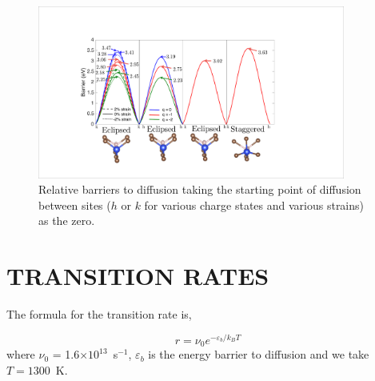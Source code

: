 \documentclass[aps,prb,preprint,superscriptaddress]{revtex4-1}
\begin{document}
\begin{figure}[ht!] 
\centering         
\includegraphics[width=0.9\textwidth]{barriers3.pdf}
\caption{Relative barriers to diffusion taking the starting point of diffusion between sites ($h$ or $k$ for various charge states and various strains) as the zero.} 
\label{fig:barr3}
\end{figure}

 
\section{\label{diffusivity}TRANSITION RATES}

The formula for the transition rate is,

\begin{equation}
r = \nu_0e^{-\varepsilon_b/k_BT}
\label{eq:diffusivity}
\end{equation}
where $\nu_0$ = 1.6$\times10^{13}$~s$^{-1}$, $\varepsilon_b$ is the energy barrier to diffusion and we take $T = 1300$~K. 
\end{document}
